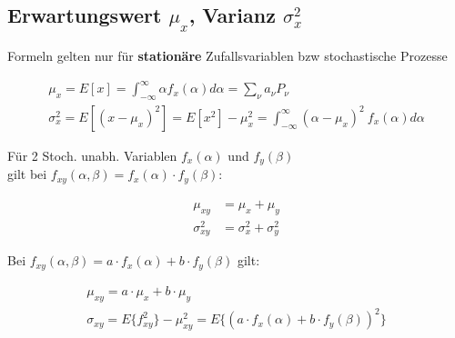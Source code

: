 \documentclass[10pt,a4paper]{article}
\begin{document}
\subsection{Erwartungswert $\mu_x$, Varianz $\sigma_x^2$}
Formeln gelten nur für \textbf{stationäre} Zufallsvariablen bzw stochastische Prozesse
  \begin{mdframed}[style=exercise]
    \begin{align}
        \mu_x = E[x] = \displaystyle\int_{-\infty}^{\infty} \alpha f_x(\alpha) d\alpha = \displaystyle\sum_{\nu}^{} a_\nu P_\nu\\
        \sigma_x^2 = E[(x-\mu_x)^2] = E[x^2]-\mu_x^2  = \displaystyle\int_{-\infty}^{\infty} (\alpha-\mu_x)^2 \ f_x(\alpha) d\alpha
    \end{align}
  \end{mdframed}
Für 2 Stoch. unabh. Variablen $f_x(\alpha)$ und $f_y(\beta)$ \\
gilt bei $f_{xy}(\alpha,\beta) = f_x(\alpha)\cdot f_y(\beta)$:\\
  \begin{mdframed}[style=exercise]
    \begin{align}
        \mu_{xy} &= \mu_{x} + \mu_{y}\\
        \sigma_{xy}^2 &= \sigma_{x}^2 + \sigma_{y}^2
    \end{align}
  \end{mdframed}
\begin{minipage}{0.5\textwidth}  
Bei $f_{xy}(\alpha,\beta) = a\cdot f_x(\alpha)+ b\cdot f_y(\beta)$ gilt:\\
  \begin{mdframed}[style=exercise]
    \begin{align}
        \mu_{xy} = a\cdot \mu_{x} + b \cdot \mu_{y}\\
        \sigma_{xy} = E\{f_{xy}^{2}\}-\mu_{xy}^{2}=E\{(a\cdot f_x(\alpha)+ b\cdot f_y(\beta))^{2}\}
    \end{align}
  \end{mdframed}
\end{minipage}
%
\end{document}
